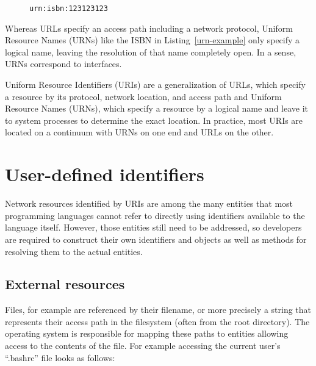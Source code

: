 \documentclass[preprint,authoryear]{acm_proc_article-sp}
\begin{document}
\begin{figure}[htbp]
\begin{lstlisting}[style=L,label=urn-example,caption=A Uniform Resource Name.]
urn:isbn:123123123
\end{lstlisting}
\end{figure}

Whereas URLs specify an access path including a network protocol, Uniform 
Resource Names (URNs) like the ISBN in Listing~\ref{urn-example} only specify a logical
name, leaving the resolution of that name completely open.  In a sense, URNs
correspond to interfaces.

Uniform Resource Identifiers (URIs) are a generalization of URLs, which specify a
resource by its protocol, network location, and access path and Uniform Resource Names (URNs),
which specify
a resource by a logical name and leave it to system processes to 
determine the exact location.  In practice, most URIs are located on
a continuum with URNs on one end and URLs on the other.


\section{User-defined identifiers}
\label{user-defined-identifiers}

Network resources identified by URIs are among the many entities that most
programming languages cannot refer to directly using identifiers available to the
language itself.
However, those entities still need to be addressed, so developers are required
to construct their own identifiers  and objects as well as methods for resolving them to the actual
entities.

\subsection{External resources}

Files, for example are referenced by their filename, or more precisely
a string that represents their access path in the filesystem (often from the root 
directory).  The operating system is responsible for mapping these
paths to entities allowing access to the contents of the file.  For example accessing
the current user's ``.bashrc'' file looks as follows:

\end{document}
